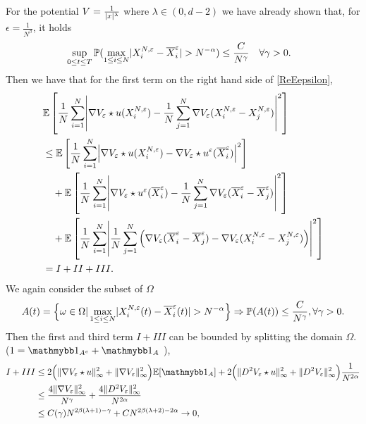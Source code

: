 For the potential $V=\frac{1}{\lvert x\rvert^{\lambda}}$ where $\lambda\in (0,d-2)$ we have already shown that, for $\epsilon =\frac{1}{N^{\beta}}$, it holds
 \begin{align*}
  & \sup_{0\leq t\leq T}\mathbb{P}(\max_{1\leq i\leq N} \lvert X_i^{N,\varepsilon} -\overline{X}_i^{\varepsilon}  \rvert > N^{-\alpha} ) \le \frac{C}{N^{\gamma}}  \quad \forall \gamma>0.
 \end{align*}
Then we have that for the first term on the right hand side of \autoref{ReEepsilon},
 \begin{align*}
   &\E\left[\frac{1}{N} \sum_{i=1}^{N} \abs*{\nabla V_{\epsilon} \star  u(X_i^{N,\epsilon} ) - \frac{1}{N} \sum_{j=1}^{N} \nabla V_{\epsilon}(X_i^{N,\epsilon} - X_j^{N,\epsilon} )}^2  \right]\\
   &\le \E\left[\frac{1}{N} \sum_{i=1}^{N} \abs*{\nabla V_{\epsilon} \star  u(X_i^{N,\epsilon} ) - \nabla V_{\epsilon} \star  u^\epsilon(\overline{X}_i^{\epsilon}  )}^2  \right]\\
 & \quad +  \E\left[\frac{1}{N} \sum_{i=1}^{N} \abs*{\nabla V_{\epsilon} \star  u^\epsilon(\overline{X}_i^{\epsilon} ) - \frac{1}{N} \sum_{j=1}^{N} \nabla V_{\epsilon}(\overline{X}_i^{\epsilon} -\overline{X}_j^{\epsilon})}^2  \right]\\
 & \quad +  \E\left[\frac{1}{N} \sum_{i=1}^{N} \abs*{ \frac{1}{N} \sum_{j=1}^{N} \Big(\nabla V_{\epsilon}(\overline{X}_i^{\epsilon} - \overline{X}_j^{\epsilon} )- \nabla V_{\epsilon}(X_i^{N,\epsilon} - X_j^{N,\epsilon})\Big)}^2  \right]\\
   &= I + II + III
 .\end{align*}
 We again consider  the subset of $\Omega$
 \begin{align*}
   A(t) = \Big\{\omega  \in  \Omega  | \max_{1\leq i\leq N} \lvert X_i^{N,\varepsilon} (t) - \overline{X}_i^{\varepsilon}(t)  \rvert > N^{-\alpha}\Big\}   \Rightarrow \mathbb{P}(A(t)) \le  \frac{C}{N^{\gamma} }, \forall\gamma>0
.\end{align*}
 Then the first and third term $I+III$ can be bounded by splitting the domain $\Omega$. ($1=\cha_{A^{c}} + \cha_{A}  $ ),
 \begin{align*}
  I+ III &\le  2\Big( \|\nabla V_{\epsilon}\star u\|_{\infty}^{2}+\|\nabla V_{\epsilon}\|_{\infty}^{2}\Big) \E[\cha_{A}]  + 2\Big( \|D^2 V_{\epsilon}\star u\|_{\infty}^{2}+\|D^2 V_{\epsilon}\|_{\infty}^{2}\Big)\frac{1}{N^{2\alpha}} \\
      &\le  \frac{4 \|\nabla V_{\epsilon}\|_{\infty}^{2}}{N^{\gamma} } +  \frac{4 \|D^2 V_{\epsilon}\|_{\infty}^{2}}{N^{2\alpha} } \\
     &  \leq C(\gamma)N^{2\beta(\lambda+1)-\gamma}+CN^{2\beta(\lambda+2)-2\alpha}\to 0,
\end{align*}
